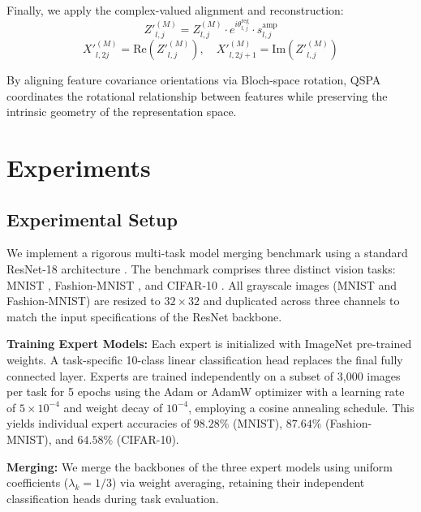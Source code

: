\documentclass{article}
\begin{document}
Finally, we apply the complex-valued alignment and reconstruction:
\begin{equation}
    {Z'}^{(M)}_{l, j} = Z^{(M)}_{l, j} \cdot e^{i \theta^{\text{reg}}_{l, j}} \cdot s^{\text{amp}}_{l, j}
\end{equation}
\begin{equation}
    {X'}^{(M)}_{l, 2j} = \text{Re}\left( {Z'}^{(M)}_{l, j} \right), \quad {X'}^{(M)}_{l, 2j+1} = \text{Im}\left( {Z'}^{(M)}_{l, j} \right)
\end{equation}

By aligning feature covariance orientations via Bloch-space rotation, QSPA coordinates the rotational relationship between features while preserving the intrinsic geometry of the representation space.

\section{Experiments}
\label{submission:experiments}

\subsection{Experimental Setup}
We implement a rigorous multi-task model merging benchmark using a standard ResNet-18 architecture \cite{he2016deep}. The benchmark comprises three distinct vision tasks: MNIST \cite{lecun1998gradient}, Fashion-MNIST \cite{xiao2017fashion}, and CIFAR-10 \cite{krizhevsky2009learning}. All grayscale images (MNIST and Fashion-MNIST) are resized to $32 \times 32$ and duplicated across three channels to match the input specifications of the ResNet backbone.

\textbf{Training Expert Models:} Each expert is initialized with ImageNet pre-trained weights. A task-specific 10-class linear classification head replaces the final fully connected layer. Experts are trained independently on a subset of 3,000 images per task for 5 epochs using the Adam \cite{kingma2014adam} or AdamW optimizer \cite{loschilov2017decoupled} with a learning rate of $5 \times 10^{-4}$ and weight decay of $10^{-4}$, employing a cosine annealing schedule. This yields individual expert accuracies of \textbf{$98.28\%$} (MNIST), \textbf{$87.64\%$} (Fashion-MNIST), and \textbf{$64.58\%$} (CIFAR-10).

\textbf{Merging:} We merge the backbones of the three expert models using uniform coefficients ($\lambda_k = 1/3$) via weight averaging, retaining their independent classification heads during task evaluation.
\end{document}
